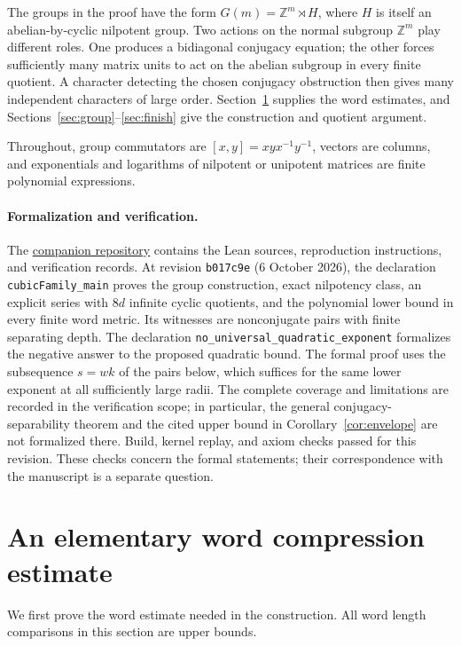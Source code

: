\documentclass[11pt,letterpaper]{amsart}
\numberwithin{equation}{section}
\theoremstyle{remark}
\newcommand{\Z}{\mathbb Z}
\begin{document}
The groups in the proof have the form $G(m)=\Z^m\rtimes H$, where
$H$ is itself an abelian-by-cyclic nilpotent group. Two actions on the
normal subgroup $\Z^m$ play different roles. One produces a bidiagonal
conjugacy equation; the other forces sufficiently many matrix units to
act on the abelian subgroup in every finite quotient. A character
detecting the chosen conjugacy obstruction then gives many independent
characters of large order. Section~\ref{sec:compression} supplies the
word estimates, and Sections~\ref{sec:group}--\ref{sec:finish} give the
construction and quotient argument.

Throughout, group commutators are $[x,y]=xyx^{-1}y^{-1}$, vectors are
columns, and exponentials and logarithms of nilpotent or unipotent
matrices are finite polynomial expressions.

\paragraph{Formalization and verification.}
The \href{https://github.com/barnettcaleb1/nilpotent-conjugacy}{companion
repository} contains the Lean sources, reproduction instructions, and
verification records. At revision \texttt{b017c9e} (6 October 2026), the
declaration \texttt{cubicFamily\_main} proves the group construction,
exact nilpotency class, an explicit series with $8d$ infinite cyclic
quotients, and the polynomial lower bound in every finite word metric.
Its witnesses are nonconjugate pairs with finite separating depth. The
declaration \texttt{no\_universal\_quadratic\_exponent} formalizes the
negative answer to the proposed quadratic bound. The formal proof uses
the subsequence $s=wk$ of the pairs below, which suffices for the same
lower exponent at all sufficiently large radii. The complete coverage
and limitations are recorded in the verification scope; in particular,
the general conjugacy-separability theorem and the cited upper bound in
Corollary~\ref{cor:envelope} are not formalized there. Build, kernel
replay, and axiom checks passed for this revision. These checks concern
the formal statements; their correspondence with the manuscript is a
separate question.

\section{An elementary word compression estimate}\label{sec:compression}

We first prove the word estimate needed in the construction. All word
length comparisons in this section are upper bounds.
\end{document}
